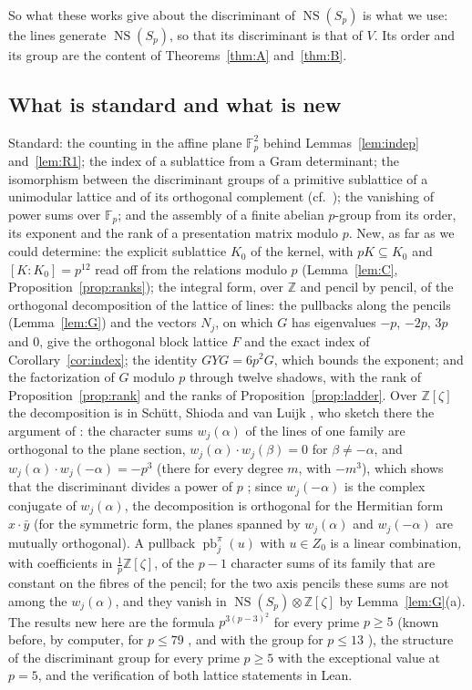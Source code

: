 \documentclass[11pt]{article}
\theoremstyle{definition}
\theoremstyle{remark}
\newcommand{\Z}{\mathbb{Z}}
\newcommand{\F}{\mathbb{F}}
\newcommand{\NS}{\operatorname{NS}}
\newcommand{\pb}{\operatorname{pb}}
\newcommand{\SAT}{K_0}
\begin{document}
So what these works give about the discriminant of $\NS(S_p)$ is what we use: the lines generate $\NS(S_p)$, so that its discriminant is that of $V$. Its order and its group are the content of Theorems~\ref{thm:A} and~\ref{thm:B}.

\subsection{What is standard and what is new}

Standard: the counting in the affine plane $\F_p^2$ behind Lemmas~\ref{lem:indep} and~\ref{lem:R1}; the index of a sublattice from a Gram determinant; the isomorphism between the discriminant groups of a primitive sublattice of a unimodular lattice and of its orthogonal complement (cf.~\cite{Nik}); the vanishing of power sums over $\F_p$; and the assembly of a finite abelian $p$-group from its order, its exponent and the rank of a presentation matrix modulo $p$. New, as far as we could determine: the explicit sublattice $\SAT$ of the kernel, with $pK\subseteq\SAT$ and $[K:\SAT]=p^{12}$ read off from the relations modulo $p$ (Lemma~\ref{lem:C}, Proposition~\ref{prop:ranks}); the integral form, over $\Z$ and pencil by pencil, of the orthogonal decomposition of the lattice of lines: the pullbacks along the pencils (Lemma~\ref{lem:G}) and the vectors $N_j$, on which $G$ has eigenvalues $-p$, $-2p$, $3p$ and $0$, give the orthogonal block lattice $F$ and the exact index of Corollary~\ref{cor:index}; the identity $GYG=6p^2G$, which bounds the exponent; and the factorization of $G$ modulo $p$ through twelve shadows, with the rank of Proposition~\ref{prop:rank} and the ranks of Proposition~\ref{prop:ladder}. Over $\Z[\zeta]$ the decomposition is in Sch\"utt, Shioda and van Luijk \cite[\S3, (4)--(6)]{SSvL}, who sketch there the argument of \cite{Sh82}: the character sums $w_j(\alpha)$ of the lines of one family are orthogonal to the plane section, $w_j(\alpha)\cdot w_j(\beta)=0$ for $\beta\neq-\alpha$, and $w_j(\alpha)\cdot w_j(-\alpha)=-p^3$ (there for every degree $m$, with $-m^3$), which shows that the discriminant divides a power of $p$ \cite[Corollary~3.2]{SSvL}; since $w_j(-\alpha)$ is the complex conjugate of $w_j(\alpha)$, the decomposition is orthogonal for the Hermitian form $x\cdot\bar y$ (for the symmetric form, the planes spanned by $w_j(\alpha)$ and $w_j(-\alpha)$ are mutually orthogonal). A pullback $\pb_j^\pi(u)$ with $u\in Z_0$ is a linear combination, with coefficients in $\tfrac1p\Z[\zeta]$, of the $p-1$ character sums of its family that are constant on the fibres of the pencil; for the two axis pencils these sums are not among the $w_j(\alpha)$, and they vanish in $\NS(S_p)\otimes\Z[\zeta]$ by Lemma~\ref{lem:G}(a). The results new here are the formula $p^{3(p-3)^2}$ for every prime $p\ge5$ (known before, by computer, for $p\le79$ \cite{SSvL}, and with the group for $p\le13$ \cite{AMV}), the structure of the discriminant group for every prime $p\ge5$ with the exceptional value at $p=5$, and the verification of both lattice statements in Lean.
\end{document}
